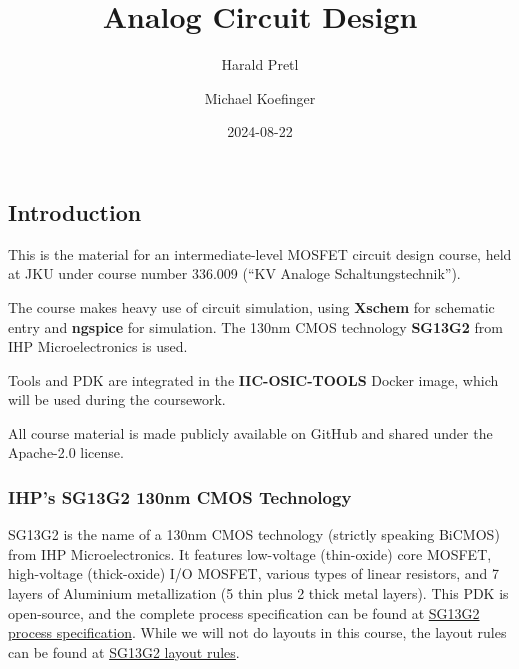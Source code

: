 \documentclass[
  a4paper,
  DIV=11,
  numbers=noendperiod]{scrartcl}
\title{Analog Circuit Design}
\author{Harald Pretl \and Michael Koefinger}
\date{2024-08-22}
\renewcommand*\contentsname{Table of contents}
\newcommand\contentsname{Table of contents}
\begin{document}
\maketitle

\renewcommand*\contentsname{Table of contents}
{
\hypersetup{linkcolor=}
\setcounter{tocdepth}{3}
\tableofcontents
}

\subsection{Introduction}\label{sec-intro}

This is the material for an intermediate-level MOSFET circuit design
course, held at JKU under course number 336.009 (``KV Analoge
Schaltungstechnik'').

The course makes heavy use of circuit simulation, using \textbf{Xschem}
for schematic entry and \textbf{ngspice} for simulation. The 130nm CMOS
technology \textbf{SG13G2} from IHP Microelectronics is used.

Tools and PDK are integrated in the \textbf{IIC-OSIC-TOOLS} Docker
image, which will be used during the coursework.

\begin{tcolorbox}[enhanced jigsaw, arc=.35mm, leftrule=.75mm, toprule=.15mm, bottomrule=.15mm, opacityback=0, toptitle=1mm, colbacktitle=quarto-callout-note-color!10!white, colframe=quarto-callout-note-color-frame, left=2mm, titlerule=0mm, bottomtitle=1mm, coltitle=black, title=\textcolor{quarto-callout-note-color}{\faInfo}\hspace{0.5em}{Note}, breakable, rightrule=.15mm, colback=white, opacitybacktitle=0.6]

All course material is made publicly available on GitHub and shared
under the Apache-2.0 license.

\end{tcolorbox}

\subsubsection{IHP's SG13G2 130nm CMOS
Technology}\label{ihps-sg13g2-130nm-cmos-technology}

SG13G2 is the name of a 130nm CMOS technology (strictly speaking BiCMOS)
from IHP Microelectronics. It features low-voltage (thin-oxide) core
MOSFET, high-voltage (thick-oxide) I/O MOSFET, various types of linear
resistors, and 7 layers of Aluminium metallization (5 thin plus 2 thick
metal layers). This PDK is open-source, and the complete process
specification can be found at
\href{https://github.com/IHP-GmbH/IHP-Open-PDK/blob/main/ihp-sg13g2/libs.doc/doc/SG13G2_os_process_spec.pdf}{SG13G2
process specification}. While we will not do layouts in this course, the
layout rules can be found at
\href{https://github.com/IHP-GmbH/IHP-Open-PDK/blob/main/ihp-sg13g2/libs.doc/doc/SG13G2_os_layout_rules.pdf}{SG13G2
layout rules}.
\end{document}

